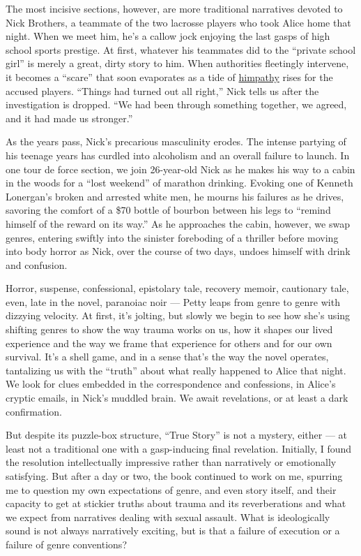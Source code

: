 The most incisive sections, however, are more traditional narratives
devoted to Nick Brothers, a teammate of the two lacrosse players who
took Alice home that night. When we meet him, he's a callow jock
enjoying the last gasps of high school sports prestige. At first,
whatever his teammates did to the ``private school girl'' is merely a
great, dirty story to him. When authorities fleetingly intervene, it
becomes a ``scare'' that soon evaporates as a tide of
\href{https://www.nytimes3xbfgragh.onion/2018/09/26/opinion/brett-kavanaugh-hearing-himpathy.html}{himpathy}
rises for the accused players. ``Things had turned out all right,'' Nick
tells us after the investigation is dropped. ``We had been through
something together, we agreed, and it had made us stronger.''

As the years pass, Nick's precarious masculinity erodes. The intense
partying of his teenage years has curdled into alcoholism and an overall
failure to launch. In one tour de force section, we join 26-year-old
Nick as he makes his way to a cabin in the woods for a ``lost weekend''
of marathon drinking. Evoking one of Kenneth Lonergan's broken and
arrested white men, he mourns his failures as he drives, savoring the
comfort of a \$70 bottle of bourbon between his legs to ``remind himself
of the reward on its way.'' As he approaches the cabin, however, we swap
genres, entering swiftly into the sinister foreboding of a thriller
before moving into body horror as Nick, over the course of two days,
undoes himself with drink and confusion.

Horror, suspense, confessional, epistolary tale, recovery memoir,
cautionary tale, even, late in the novel, paranoiac noir --- Petty leaps
from genre to genre with dizzying velocity. At first, it's jolting, but
slowly we begin to see how she's using shifting genres to show the way
trauma works on us, how it shapes our lived experience and the way we
frame that experience for others and for our own survival. It's a shell
game, and in a sense that's the way the novel operates, tantalizing us
with the ``truth'' about what really happened to Alice that night. We
look for clues embedded in the correspondence and confessions, in
Alice's cryptic emails, in Nick's muddled brain. We await revelations,
or at least a dark confirmation.

But despite its puzzle-box structure, ``True Story'' is not a mystery,
either --- at least not a traditional one with a gasp-inducing final
revelation. Initially, I found the resolution intellectually impressive
rather than narratively or emotionally satisfying. But after a day or
two, the book continued to work on me, spurring me to question my own
expectations of genre, and even story itself, and their capacity to get
at stickier truths about trauma and its reverberations and what we
expect from narratives dealing with sexual assault. What is
ideologically sound is not always narratively exciting, but is that a
failure of execution or a failure of genre conventions?

